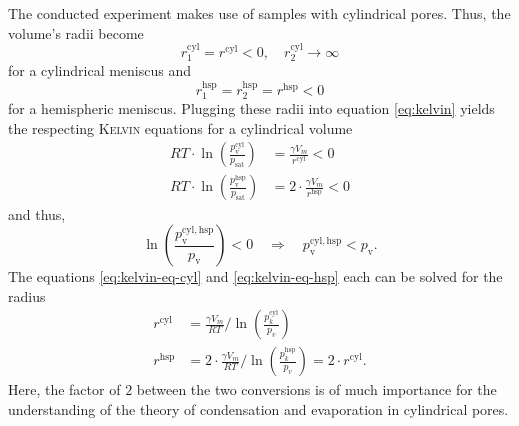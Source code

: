 \documentclass[../thesis.tex]{subfiles}
\begin{document}
    The conducted experiment makes use of samples with cylindrical pores. Thus, the volume's radii become
    \begin{equation*}
        r_1^\mathrm{cyl}=r^\mathrm{cyl}<0, \quad r_2^\mathrm{cyl} \rightarrow \infty
        \label{eq:radii-cyl}
    \end{equation*}
    for a cylindrical meniscus and
    \begin{equation*}
        r_1^\mathrm{hsp}=r_2^\mathrm{hsp}=r^\mathrm{hsp}<0
        \label{eq:radii-hsp}
    \end{equation*}
    for a hemispheric meniscus. Plugging these radii into equation \cref{eq:kelvin} yields the respecting \textsc{Kelvin} equations for a cylindrical volume
    \begin{align}
        RT\cdot \ln{\left(\frac{p_\mathrm{v}^\mathrm{cyl}}{p_\mathrm{sat}}\right)} &= \frac{\gamma V_m}{r^\mathrm{cyl}} < 0 \label{eq:kelvin-eq-cyl}   \\
        RT\cdot \ln{\left(\frac{p_\mathrm{v}^\mathrm{hsp}}{p_\mathrm{sat}}\right)} &= 2\cdot \frac{\gamma V_m}{r^\mathrm{hsp}} < 0
        \label{eq:kelvin-eq-hsp}
    \end{align}
    and thus,
    \begin{equation*}
        \ln{\left(\frac{p_\mathrm{v}^\mathrm{cyl,hsp}}{p_\mathrm{v}}\right)} < 0\quad \Longrightarrow\quad p_\mathrm{v}^\mathrm{cyl,hsp} < p_\mathrm{v}.
    \end{equation*}
    The equations \cref{eq:kelvin-eq-cyl} and \cref{eq:kelvin-eq-hsp} each can be solved for the radius
    \begin{align}
        r^\mathrm{cyl} &= \frac{\gamma V_m}{RT} / \ln{\left(\frac{p_k^\mathrm{cyl}}{p_v}\right)}  \\
        r^\mathrm{hsp} &= 2\cdot \frac{\gamma V_m}{RT} / \ln{\left(\frac{p_k^\mathrm{hsp}}{p_v}\right)} = 2\cdot r^\mathrm{cyl}.
    \end{align}
    Here, the factor of $2$ between the two conversions is of much importance for the understanding of the theory of condensation and evaporation in cylindrical pores.
\end{document}

